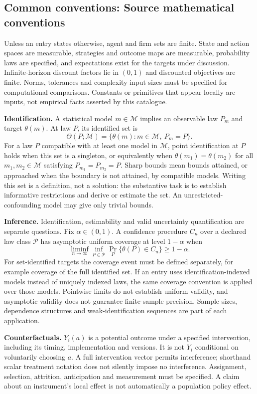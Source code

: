 \documentclass[11pt,a4paper]{article}
\begin{document}
\subsection*{Common conventions: Source mathematical conventions}

Unless an entry states otherwise, agent and firm sets are finite. State and action spaces are measurable, strategies and outcome maps are measurable, probability laws are specified, and expectations exist for the targets under discussion. Infinite-horizon discount factors lie in $(0,1)$ and discounted objectives are finite. Norms, tolerances and complexity input sizes must be specified for computational comparisons. Constants or primitives that appear locally are inputs, not empirical facts asserted by this catalogue.

\textbf{Identification.} A statistical model $m\in\mathcal M$ implies an observable law $P_m$ and target $\theta(m)$. At law $P$, its identified set is
\[
\Theta(P;\mathcal M)=\{\theta(m):m\in\mathcal M,\ P_m=P\}.
\]
For a law $P$ compatible with at least one model in $\mathcal M$, point identification at $P$ holds when this set is a singleton, or equivalently when $\theta(m_1)=\theta(m_2)$ for all $m_1,m_2\in\mathcal M$ satisfying $P_{m_1}=P_{m_2}=P$. Sharp bounds mean bounds attained, or approached when the boundary is not attained, by compatible models. Writing this set is a definition, not a solution: the substantive task is to establish informative restrictions and derive or estimate the set. An unrestricted-confounding model may give only trivial bounds.

\textbf{Inference.} Identification, estimability and valid uncertainty quantification are separate questions. Fix $\alpha\in(0,1)$. A confidence procedure $C_n$ over a declared law class $\mathcal P$ has asymptotic uniform coverage at level $1-\alpha$ when
\[
\liminf_{n\to\infty}\inf_{P\in\mathcal P}\Pr_P\{\theta(P)\in C_n\}\geq1-\alpha.
\]
For set-identified targets the coverage event must be defined separately, for example coverage of the full identified set. If an entry uses identification-indexed models instead of uniquely indexed laws, the same coverage convention is applied over those models. Pointwise limits do not establish uniform validity, and asymptotic validity does not guarantee finite-sample precision. Sample sizes, dependence structures and weak-identification sequences are part of each application.

\textbf{Counterfactuals.} $Y_i(a)$ is a potential outcome under a specified intervention, including its timing, implementation and versions. It is not $Y_i$ conditional on voluntarily choosing $a$. A full intervention vector permits interference; shorthand scalar treatment notation does not silently impose no interference. Assignment, selection, attrition, anticipation and measurement must be specified. A claim about an instrument's local effect is not automatically a population policy effect.
\end{document}

